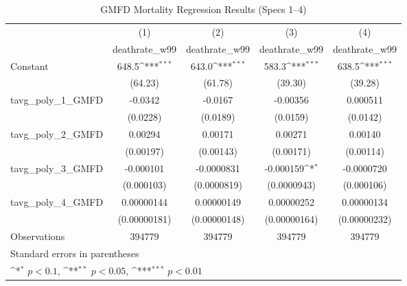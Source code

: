 \begin{table}[htbp]\centering
\def\sym#1{\ifmmode^{#1}\else\(^{#1}\)\fi}
\caption{GMFD Mortality Regression Results (Specs 1–4)}
\begin{tabular}{l*{4}{c}}
\hline\hline
                    &\multicolumn{1}{c}{(1)}&\multicolumn{1}{c}{(2)}&\multicolumn{1}{c}{(3)}&\multicolumn{1}{c}{(4)}\\
                    &\multicolumn{1}{c}{deathrate\_w99}&\multicolumn{1}{c}{deathrate\_w99}&\multicolumn{1}{c}{deathrate\_w99}&\multicolumn{1}{c}{deathrate\_w99}\\
\hline
Constant            &       648.5\sym{***}&       643.0\sym{***}&       583.3\sym{***}&       638.5\sym{***}\\
                    &     (64.23)         &     (61.78)         &     (39.30)         &     (39.28)         \\
[1em]
tavg\_poly\_1\_GMFD    &     -0.0342         &     -0.0167         &    -0.00356         &    0.000511         \\
                    &    (0.0228)         &    (0.0189)         &    (0.0159)         &    (0.0142)         \\
[1em]
tavg\_poly\_2\_GMFD    &     0.00294         &     0.00171         &     0.00271         &     0.00140         \\
                    &   (0.00197)         &   (0.00143)         &   (0.00171)         &   (0.00114)         \\
[1em]
tavg\_poly\_3\_GMFD    &   -0.000101         &  -0.0000831         &   -0.000159\sym{*}  &  -0.0000720         \\
                    &  (0.000103)         & (0.0000819)         & (0.0000943)         &  (0.000106)         \\
[1em]
tavg\_poly\_4\_GMFD    &  0.00000144         &  0.00000149         &  0.00000252         &  0.00000134         \\
                    &(0.00000181)         &(0.00000148)         &(0.00000164)         &(0.00000232)         \\
\hline
Observations        &      394779         &      394779         &      394779         &      394779         \\
\hline\hline
\multicolumn{5}{l}{\footnotesize Standard errors in parentheses}\\
\multicolumn{5}{l}{\footnotesize \sym{*} \(p<0.1\), \sym{**} \(p<0.05\), \sym{***} \(p<0.01\)}\\
\end{tabular}
\end{table}
